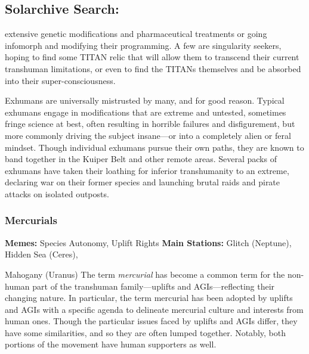 \subsection{Solarchive Search:   }

extensive genetic modifications and pharmaceutical 
treatments or going infomorph and modifying their 
programming. A few are singularity seekers, hoping 
to find some TITAN relic that will allow them to transcend their current transhuman limitations, or even 
to find the TITANs themselves and be absorbed into 
their super-consciousness.

Exhumans are universally mistrusted by many, and 
for good reason. Typical exhumans engage in modifications that are extreme and untested, sometimes 
fringe science at best, often resulting in horrible failures and disfigurement, but more commonly driving 
the subject insane—or into a completely alien or feral 
mindset. Though individual exhumans pursue their 
own paths, they are known to band together in the 
Kuiper Belt and other remote areas. Several packs 
of exhumans have taken their loathing for inferior 
transhumanity to an extreme, declaring war on their 
former species and launching brutal raids and pirate 
attacks on isolated outposts.

\subsubsection{Mercurials}

\textbf{Memes:} Species Autonomy, Uplift Rights
\textbf{Main Stations:} Glitch (Neptune), Hidden Sea (Ceres), 

Mahogany (Uranus)
The term \textit{mercurial} has become a common term for 
the non-human part of the transhuman family—uplifts and AGIs—reflecting their changing nature. In 
particular, the term mercurial has been adopted by 
uplifts and AGIs with a specific agenda to delineate 
mercurial culture and interests from human ones. 
Though the particular issues faced by uplifts and 
AGIs differ, they have some similarities, and so they 
are often lumped together. Notably, both portions of 
the movement have human supporters as well.


